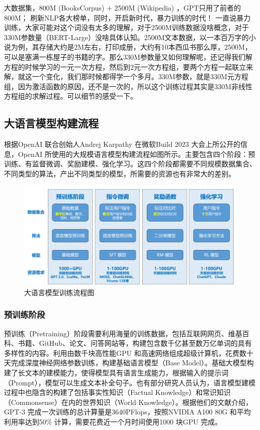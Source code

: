 \documentclass{article} %
\begin{document}
大数据集，800M (BooksCorpus) + 2500M (Wikipedia) ，GPT只用了前者的800M；
刷新NLP各大榜单，同时，开启新时代，暴力训练的时代！
一直说暴力训练，大家可能对这个词没有太多的理解，对于2500M训练数据没啥概念，对于330M参数量（BERT-Large）没啥具体认知。2500M文本数据，以一本百万字的小说为例，其存储大约是2M左右，打印成册，大约有10本西瓜书那么厚，2500M，可以是塞满一栋屋子的书籍的字。那么330M参数量又如何理解呢，还记得我们解方程的时候学习的一元一次方程，然后到2元一次方程组，要两个方程一起联立来解，就这一个变化，我们那时候都得学一个多月。330M参数，就是330M元方程组，因为激活函数的原因，还不是一次的，所以这个训练过程其实是330M非线性方程组的求解过程。可以细节的感受一下。

\subsection{大语言模型构建流程}
根据OpenAI 联合创始人Andrej Karpathy 在微软Build 2023 大会上所公开的信息，OpenAI 所使用的大规模语言模型构建流程如图所示。主要包含四个阶段：预训练、有监督微调、奖励建模、强化学习。这四个阶段都需要不同规模数据集合、不同类型的算法，产出不同类型的模型，所需要的资源也有非常大的差别。
\begin{figure}[h] %
    \centering %
    \includegraphics[width=\textwidth]{大语言模型训练流程图.png} %
    \caption{大语言模型训练流程图} %
    \label{fig:example} %
\end{figure}
\FloatBarrier
\subsubsection{预训练阶段}
预训练（Pretraining）阶段需要利用海量的训练数据，包括互联网网页、维基百科、书籍、GitHub、论文、问答网站等，构建包含数千亿甚至数万亿单词的具有多样性的内容。利用由数千块高性能GPU 和高速网络组成超级计算机，花费数十天完成深度神经网络参数训练，构建基础语言模型（Base Model）。基础大模型构建了长文本的建模能力，使得模型具有语言生成能力，根据输入的提示词（Prompt），模型可以生成文本补全句子。也有部分研究人员认为，语言模型建模过程中也隐含的构建了包括事实性知识（Factual Knowledge）和常识知识（Commonsense）在内的世界知识（World Knowledge）。根据他们的文献介绍，GPT-3 完成一次训练的总计算量是3640PFlops，按照NVIDIA A100 80G 和平均利用率达到50\% 计算，需要花费近一个月时间使用1000 块GPU 完成。
\end{document}
